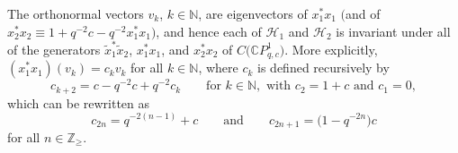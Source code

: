\documentclass[pdftex]{sigma}
\begin{document}
\begin{proposition}\label{recursive} The orthonormal vectors $v_{k}$, $k\in\mathbb{N}$, are
eigenvectors of $x_{1}^{\ast}x_{1}$ $($and of $x_{2}^{\ast}x_{2}\equiv
1+q^{-2}c-q^{-2}x_{1}^{\ast}x_{1})$, and hence each of $\mathcal{H}_{1}$ and
$\mathcal{H}_{2}$ is invariant under all of the generators $\tilde{x}
_{1}^{\ast}\tilde{x}_{2}$, $x_{1}^{\ast}x_{1}$, and $x_{2}^{\ast}x_{2}$ of
$C\big(\mathbb{C}P_{q,c}^{1}\big) $. More explicitly, $(x_{1}^{\ast}x_{1}) ( v_{k}) =c_{k}v_{k}$ for all
$k\in\mathbb{N}$, where $c_{k}$ is defined recursively by
\[
c_{k+2}=c-q^{-2}c+q^{-2}c_{k}\qquad \text{for }k\in\mathbb{N},\text{\ with\ } c_{2}=1+c\text{\ and }c_{1}=0,
\]
which can be rewritten as
\[
c_{2n}=q^{-2( n-1) }+c\qquad \text{and} \qquad c_{2n+1}=\big(1-q^{-2n}\big) c
\]
for all $n\in\mathbb{Z}_{\geq}$.
\end{proposition}
\end{document}
